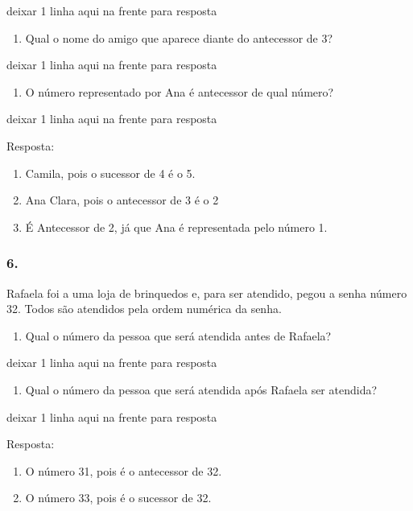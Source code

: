 deixar 1 linha aqui na frente para resposta

\begin{enumerate}
\def\labelenumi{\alph{enumi})}
\item
  Qual o nome do amigo que aparece diante do antecessor de 3?
\end{enumerate}

deixar 1 linha aqui na frente para resposta

\begin{enumerate}
\def\labelenumi{\alph{enumi})}
\item
  O número representado por Ana é antecessor de qual número?
\end{enumerate}

deixar 1 linha aqui na frente para resposta

Resposta:

\begin{enumerate}
\def\labelenumi{\alph{enumi})}
\item
  Camila, pois o sucessor de 4 é o 5.
\item
  Ana Clara, pois o antecessor de 3 é o 2
\item
  É Antecessor de 2, já que Ana é representada pelo número 1.
\end{enumerate}

\subsubsection{6.}\label{section-38}

Rafaela foi a uma loja de brinquedos e, para ser atendido, pegou a senha
número 32. Todos são atendidos pela ordem numérica da senha.

\begin{enumerate}
\def\labelenumi{\alph{enumi})}
\item
  Qual o número da pessoa que será atendida antes de Rafaela?
\end{enumerate}

deixar 1 linha aqui na frente para resposta

\begin{enumerate}
\def\labelenumi{\alph{enumi})}
\item
  Qual o número da pessoa que será atendida após Rafaela ser atendida?
\end{enumerate}

deixar 1 linha aqui na frente para resposta

Resposta:

\begin{enumerate}
\def\labelenumi{\alph{enumi})}
\item
  O número 31, pois é o antecessor de 32.
\item
  O número 33, pois é o sucessor de 32.
\end{enumerate}

